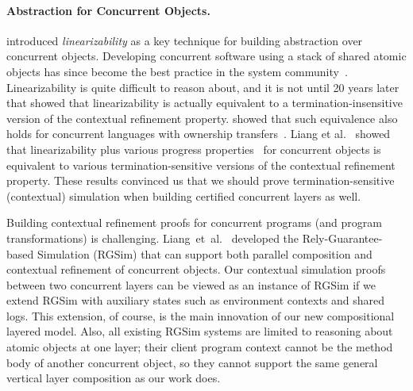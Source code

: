 \paragraph{Abstraction for Concurrent Objects.}
\cite{herlihy90} introduced {\em linearizability} as a key technique
for building abstraction over concurrent objects. Developing
concurrent software using a stack of shared atomic objects has since
become the best practice in the system
community~\cite{Herlihy08book,ospp11}. Linearizability is quite
difficult to reason about, and it is not until 20 years later that
\cite{filipovic10} showed that linearizability is actually equivalent
to a termination-insensitive version of the contextual refinement
property. \cite{Gotsman12concur} showed that such equivalence also
holds for concurrent languages with ownership
transfers~\cite{ohearn:concur04}.  Liang et al.~\cite{liang13,lili16} showed that linearizability plus various
progress properties~\cite{Herlihy08book} for concurrent objects is
equivalent to various termination-sensitive versions of the contextual
refinement property. These results convinced us that we should prove
termination-sensitive (contextual) simulation when building certified
concurrent layers as well.

 Building contextual refinement proofs
for concurrent programs (and program transformations) is challenging.
Liang~{et~al.}~\cite{RGSim,Liang14lics,lili16} developed the
Rely-Guarantee-based Simulation (RGSim) that can support both parallel
composition and  contextual refinement of concurrent
objects. Our contextual simulation proofs between two concurrent
layers can be viewed as an instance of RGSim if we extend RGSim with
auxiliary states such as environment contexts and shared logs. This
extension, of course, is the main innovation of our new compositional
layered model. Also, all existing RGSim systems are limited to reasoning
about atomic objects at one layer; their client program context cannot
be the method body of another concurrent object, so they cannot
support the same general vertical layer composition as our work does.

